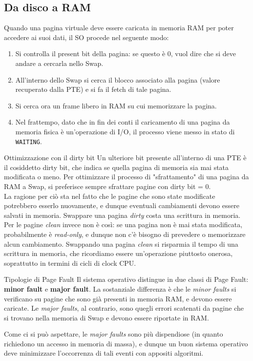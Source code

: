 \documentclass[12pt]{report}
\begin{document}
	\subsection{Da disco a RAM}
	Quando una pagina virtuale deve essere caricata in memoria RAM per poter accedere ai suoi dati, il SO procede nel seguente modo:
	\begin{enumerate}
		\item Si controlla il present bit della pagina: se questo è 0, vuol dire che si deve andare a cercarla nello Swap.
		
		\item All'interno dello Swap si cerca il blocco associato alla pagina (valore recuperato dalla PTE) e si fa il fetch di tale pagina.
		
		\item Si cerca ora un frame libero in RAM su cui memorizzare la pagina.
		
		\item Nel frattempo, dato che in fin dei conti il caricamento di una pagina da memoria fisica è un'operazione di I/O, il processo viene messo in stato di \texttt{WAITING}.
	\end{enumerate}
	
	\begin{osservazione}{Ottimizzazione con il dirty bit}{}
		Un ulteriore bit presente all'interno di una PTE è il cosiddetto dirty bit, che indica se quella pagina di memoria sia mai stata modificata o meno. Per ottimizzare il processo di "sfrattamento" di una pagina da RAM a Swap, si preferisce sempre sfrattare pagine con dirty bit = 0.\\
		La ragione per ciò sta nel fatto che le pagine che sono state modificate potrebbero esserlo nuovamente, e dunque eventuali cambiamenti devono essere salvati in memoria. Swappare una pagina \textit{dirty} costa una scrittura in memoria. Per le pagine \textit{clean} invece non è così: se una pagina non è mai stata modificata, probabilmente è \textit{read-only}, e dunque non c'è bisogno di prevedere o memorizzare alcun cambiamento. Swappando una pagina \textit{clean} si risparmia il tempo di una scrittura in memoria, che ricordiamo essere un'operazione piuttosto onerosa, soprattutto in termini di cicli di clock CPU.
	\end{osservazione}
	
	\begin{definizione}{Tipologie di Page Fault}{}
		Il sistema operativo distingue in due classi di Page Fault: \textbf{minor fault} e \textbf{major fault}. La sostanziale differenza è che le \textit{minor faults} si verificano su pagine che sono già presenti in memoria RAM, e devono essere caricate. Le \textit{major faults}, al contrario, sono quegli errori scatenati da pagine che si trovano nella memoria di Swap e devono essere riportate in RAM.
		\smallbreak
		
		Come ci si può aspettare, le \textit{major faults} sono più dispendiose (in quanto richiedono un accesso in memoria di massa), e dunque un buon sistema operativo deve minimizzare l'occorrenza di tali eventi con appositi algoritmi.
	\end{definizione}
	
\end{document}

